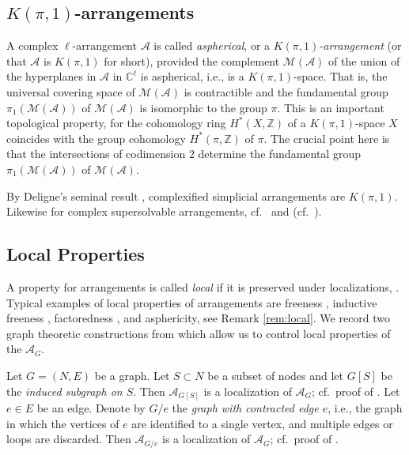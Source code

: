 \documentclass[12pt]{amsart}
\newcommand\CA{{\mathscr A}}
\newcommand\CM{{\mathcal M}}
\newcommand\BBC{{\mathbb C}}
\newcommand\BBZ{{\mathbb Z}}
\numberwithin{equation}{section}
\theoremstyle{plain}
\theoremstyle{definition}
\begin{document}
\subsection{$K(\pi,1)$-arrangements}
\label{ssect:kpionearrangements}
A complex $\ell$-arrangement $\CA$ is called  \emph{aspherical}, or a
\emph{$K(\pi,1)$-arrangement} (or that $\CA$ is $K(\pi,1)$ for short), provided
the complement $\CM(\CA)$ of the union of the hyperplanes in
$\CA$ in $\BBC^\ell$ is aspherical, i.e.,  is a
$K(\pi,1)$-space. That is, the universal covering space of $\CM(\CA)$
is contractible and the fundamental group
$\pi_1(\CM(\CA))$ of $\CM(\CA)$ is isomorphic to the group $\pi$.
This is an important
topological property, for
the cohomology ring $H^*(X, \BBZ)$ of a $K(\pi,1)$-space $X$
coincides
with the group cohomology $H^*(\pi, \BBZ)$ of $\pi$.
The crucial point here is that the intersections of codimension $2$
determine the fundamental group $\pi_1(\CM(\CA))$ of $\CM(\CA)$.

By Deligne's seminal result \cite{deligne}, complexified simplicial arrangements are $K(\pi, 1)$.
Likewise for complex supersolvable arrangements,
cf.~\cite{falkrandell:fiber-type} and \cite{terao:modular}
(cf.~\cite[Prop.\ 5.12, Thm.~5.113]{orlikterao:arrangements}).

\subsection{Local Properties}
\label{sub:local}
A property for arrangements is called \emph{local} if it is preserved under localizations, \cite[Def.~6.1]{cuntzkuehne:subgraphs}.
Typical examples of local properties of arrangements are freeness \cite[Thm.~4.37]{orlikterao:arrangements},
inductive freeness \cite[Thm~1.1]{hogeroehrleschauenburg:free}, factoredness \cite[Cor.~3.90]{orlikterao:arrangements}, and
asphericity, see Remark \ref{rem:local}.
We record two graph theoretic constructions from
\cite{cuntzkuehne:subgraphs} which allow us to
control local properties of the $\CA_G$.

Let $G = (N, E)$ be a graph.	Let $S \subset N$ be a subset of nodes and let $G[S]$ be the \emph{induced subgraph on $S$}. Then $\CA_{G[S]}$ is a localization of $\CA_G$; cf.~proof of \cite[Lem.~6.2]{cuntzkuehne:subgraphs}.
Let $e \in  E$ be an edge. Denote by $G/e$
the \emph{graph with contracted edge $e$}, i.e., the graph in which the vertices of $e$ are identified to
a single vertex, and multiple edges or loops are discarded. Then $\CA_{G/e}$ is a localization of $\CA_G$; cf.~proof of \cite[Lem.~6.4]{cuntzkuehne:subgraphs}.
\end{document}
